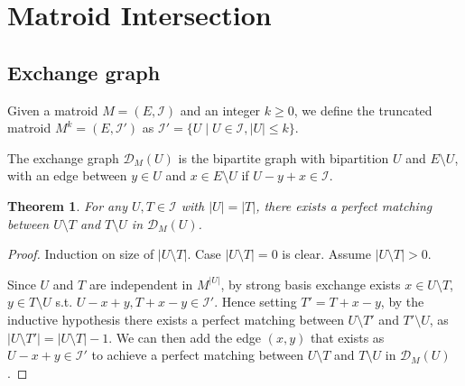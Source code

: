 \documentclass{article}
\newtheorem{theorem}{Theorem}[section]
\begin{document}
\section{Matroid Intersection}

\subsection{Exchange graph}
Given a matroid $M = (E, \mathcal{I})$ and an integer $k \geq 0$, we define the truncated matroid $M^{k} = (E, \mathcal{I}')$ as $\mathcal{I}' = \{U \mid U \in \mathcal{I}, |U| \leq k\}$.

The exchange graph $\mathcal{D}_{M}(U)$ is the bipartite graph with bipartition $U$ and $E \setminus U$, with an edge between $y \in U$ and $x \in E \setminus U$ if $U - y + x \in \mathcal{I}$.

\begin{theorem}
For any $U, T \in \mathcal{I}$ with $|U| = |T|$, there exists a perfect matching between $U \setminus T$ and $T \setminus U$ in $\mathcal{D}_{M}(U)$.
\end{theorem}
\begin{proof}
Induction on size of $|U \setminus T|$. Case $|U \setminus T| = 0$ is clear. Assume $|U \setminus T| > 0$.

Since $U$ and $T$ are independent in $M^{|U|}$, by strong basis exchange exists $x \in U \setminus T$, $y \in T \setminus U$ s.t. $U - x + y, T + x - y \in \mathcal{I}'$.
Hence setting $T' = T + x - y$, by the inductive hypothesis there exists a perfect matching between $U \setminus T'$ and $T' \setminus U$, as $|U \setminus T'| = |U \setminus T| - 1$.
We can then add the edge $(x, y)$ that exists as $U - x + y \in \mathcal{I}'$ to achieve a perfect matching between $U \setminus T$ and $T \setminus U$ in $\mathcal{D}_{M}(U)$.
\end{proof}
\end{document}
